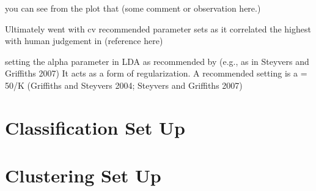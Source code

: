 you can see from the plot that (some comment or observation here.)

Ultimately went with cv recommended parameter sets as it correlated the highest with human judgement in (reference here)


setting the alpha parameter in LDA as recommended by (e.g., as in Steyvers and Griffiths 2007) It acts as a form of regularization.
A recommended setting is a = 50/K (Griffiths and Steyvers 2004; Steyvers and Griffiths 2007)

\section{Classification Set Up}


\section{Clustering Set Up}



